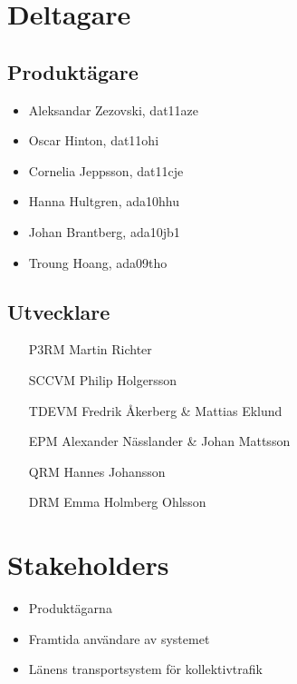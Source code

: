 \documentclass[a4paper]{article}
\begin{document}

	\section{Deltagare} %
	\label{sec:deltagare}
		\subsection{Produktägare}
			\begin{itemize}
				\item Aleksandar Zezovski, dat11aze
				\item Oscar Hinton, dat11ohi
				\item Cornelia Jeppsson, dat11cje
				\item Hanna Hultgren, ada10hhu
				\item Johan Brantberg, ada10jb1
				\item Troung Hoang, ada09tho
			\end{itemize}
		
		\subsection{Utvecklare}
			\begin{itemize}
				\item[P3RM]	Martin Richter 
				\item[SCCVM]	Philip Holgersson
				\item[TDEVM]	Fredrik Åkerberg \& Mattias Eklund
				\item[EPM]	Alexander Nässlander \& Johan Mattsson
				\item[QRM]	Hannes Johansson
				\item[DRM]	Emma Holmberg Ohlsson
			\end{itemize}
		

	\section{Stakeholders} %
	\label{sec:stakeholders}
		\begin{itemize}
			\item Produktägarna
			\item Framtida användare av systemet
			\item Länens transportsystem för kollektivtrafik
		\end{itemize}
\end{document}
